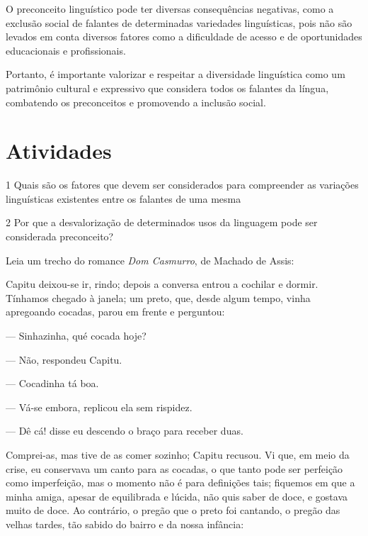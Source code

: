O preconceito linguístico pode ter diversas consequências negativas,
como a exclusão social de falantes de determinadas variedades
linguísticas, pois não são levados em conta diversos fatores como a
dificuldade de acesso e de oportunidades educacionais e profissionais.

Portanto, é importante valorizar e respeitar a diversidade linguística
como um patrimônio cultural e expressivo que considera todos os falantes
da língua, combatendo os preconceitos e promovendo a inclusão social.

\section{Atividades}

\num{1} Quais são os fatores que devem ser considerados para compreender as
variações linguísticas existentes entre os falantes de uma mesma


\num{2} Por que a desvalorização de determinados usos da linguagem pode ser
considerada preconceito?


Leia um trecho do romance \textit{Dom Casmurro}, de Machado de Assis:

Capitu deixou-se ir, rindo; depois a conversa entrou a cochilar e
dormir. Tínhamos chegado à janela; um preto, que, desde algum
tempo, vinha apregoando cocadas, parou em frente e perguntou:

--- Sinhazinha, qué cocada hoje?

--- Não, respondeu Capitu.

--- Cocadinha tá boa.

--- Vá-se embora, replicou ela sem rispidez.

--- Dê cá! disse eu descendo o braço para receber duas.

Comprei-as, mas tive de as comer sozinho; Capitu recusou. Vi
que, em meio da crise, eu conservava um canto para as cocadas, o
que tanto pode ser perfeição como imperfeição, mas o momento
não é para definições tais; fiquemos em que a minha amiga,
apesar de equilibrada e lúcida, não quis saber de doce, e gostava
muito de doce. Ao contrário, o pregão que o preto foi cantando, o
pregão das velhas tardes, tão sabido do bairro e da nossa infância:



